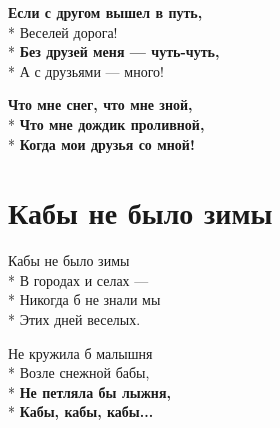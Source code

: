 \medskip

\begin{minipage}{\linewidth}
\textbf{Если с другом вышел в путь,}\\*
Веселей дорога!\\*
\textbf{Без друзей меня — чуть-чуть,}\\*
А с друзьями — много!\\
\end{minipage}\par\medskip\nobreak

\medskip

\begin{minipage}{\linewidth}
\hspace*{1.5em}\textbf{Что мне снег, что мне зной,}\\*
\hspace*{1.5em}\textbf{Что мне дождик проливной,}\\*
\hspace*{1.5em}\textbf{Когда мои друзья со мной!}\\
\end{minipage}

\vspace{\fill}\newpage

\section{Кабы не было зимы}
\label{song:Кабы_не_было_зимы}

\medskip

\begin{minipage}{\linewidth}
Кабы не было зимы\\*
В городах и селах —\\*
Никогда б не знали мы\\*
Этих дней веселых.\\
\end{minipage}\par\medskip\nobreak

\medskip

\begin{minipage}{\linewidth}
Не кружила б малышня\\*
Возле снежной бабы,\\*
\textbf{Не петляла бы лыжня,}\\*
\textbf{Кабы, кабы, кабы...}\\
\end{minipage}\par\medskip\nobreak

